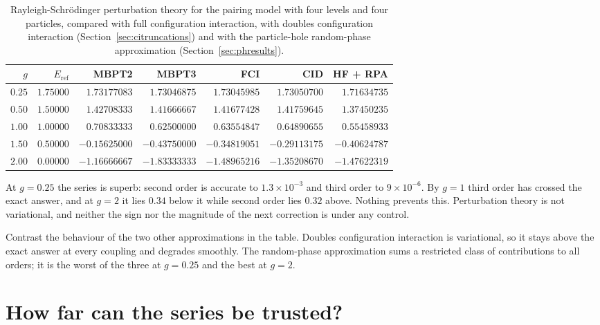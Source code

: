 \begin{table}[h]
\centering
\renewcommand{\arraystretch}{1.25}
\setlength{\tabcolsep}{7pt}
\small
\begin{tabular}{rrrrrrr}
\toprule
$g$ & $E_{\mathrm{ref}}$ & MBPT2 & MBPT3 & FCI & CID & HF + RPA\\
\midrule
$0.25$ & $1.75000$ & $1.73177083$ & $1.73046875$ & $1.73045985$
  & $1.73050700$ & $1.71634735$\\
$0.50$ & $1.50000$ & $1.42708333$ & $1.41666667$ & $1.41677428$
  & $1.41759645$ & $1.37450235$\\
$1.00$ & $1.00000$ & $0.70833333$ & $0.62500000$ & $0.63554847$
  & $0.64890655$ & $0.55458933$\\
$1.50$ & $0.50000$ & $-0.15625000$ & $-0.43750000$ & $-0.34819051$
  & $-0.29113175$ & $-0.40624787$\\
$2.00$ & $0.00000$ & $-1.16666667$ & $-1.83333333$ & $-1.48965216$
  & $-1.35208670$ & $-1.47622319$\\
\bottomrule
\end{tabular}
\caption{Rayleigh-Schr\"odinger perturbation theory for the pairing model
with four levels and four particles, compared with full configuration
interaction, with doubles configuration interaction
(Section~\ref{sec:citruncations}) and with the particle-hole random-phase
approximation (Section~\ref{sec:phresults}).}
\label{tab:mbptpairing}
\end{table}

At $g=0.25$ the series is superb: second order is accurate to
$1.3\times10^{-3}$ and third order to $9\times10^{-6}$.  By $g=1$ third order
has crossed the exact answer, and at $g=2$ it lies $0.34$ below it while
second order lies $0.32$ above.  Nothing prevents this.  Perturbation theory
is not variational, and neither the sign nor the magnitude of the next
correction is under any control.

Contrast the behaviour of the two other approximations in the table.  Doubles
configuration interaction is variational, so it stays above the exact answer
at every coupling and degrades smoothly.  The random-phase approximation sums
a restricted class of contributions to all orders; it is the worst of the
three at $g=0.25$ and the best at $g=2$.

\section{How far can the series be trusted?}
\label{sec:convergence}

